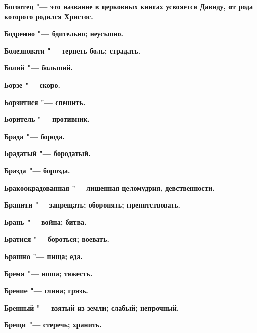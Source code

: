 \begin{multicols}{2}
\bfseries Богоотец\normalfont{} "--- это название в церковных книгах усвояется Давиду, от рода которого родился Христос. 




\bfseries Бодренно\normalfont{} "--- бдительно; неусыпно. 




\bfseries Болезновати\normalfont{} "--- терпеть боль; страдать. 




\bfseries Болий\normalfont{} "--- больший. 




\bfseries Борзе\normalfont{} "--- скоро. 




\bfseries Борзитися\normalfont{} "--- спешить. 




\bfseries Боритель\normalfont{} "--- противник. 




\bfseries Брада\normalfont{} "--- борода. 




\bfseries Брадатый\normalfont{} "--- бородатый. 




\bfseries Бразда\normalfont{} "--- борозда. 




\bfseries Бракоокрадованная\normalfont{} "--- лишенная целомудрия, девственности. 




\bfseries Бранити\normalfont{} "--- запрещать; оборонять; препятствовать. 




\bfseries Брань\normalfont{} "--- война; битва. 




\bfseries Братися\normalfont{} "--- бороться; воевать. 




\bfseries Брашно\normalfont{} "--- пища; еда. 




\bfseries Бремя\normalfont{} "--- ноша; тяжесть. 




\bfseries Брение\normalfont{} "--- глина; грязь. 




\bfseries Бренный\normalfont{} "--- взятый из земли; слабый; непрочный. 




\bfseries Брещи\normalfont{} "--- стеречь; хранить. 





\end{multicols}
